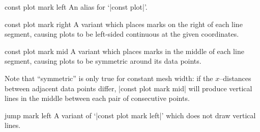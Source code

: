 {\begin{plottype}{const plot mark left}
An alias for `|const plot|'.
\end{plottype}

\begin{plottype}{const plot mark right}
 A variant which places marks on the right of each line segment, causing plots to be left-sided continuous at the given coordinates.
\begin{codeexample}[]
\end{codeexample}
\end{plottype}

\begin{plottype}{const plot mark mid}
 A variant which places marks in the middle of each line segment, causing plots to be symmetric around its data points.
\begin{codeexample}[]
\end{codeexample}
	Note that ``symmetric'' is only true for constant mesh width: if the $x$--distances between adjacent data points differ, |const plot mark mid| will produce vertical lines in the middle between each pair of consecutive points.
\end{plottype}

\begin{plottype}{jump mark left}
A variant of `|const plot mark left|' which does not draw vertical lines.
\begin{codeexample}[]
\end{codeexample}
\end{plottype}

}
